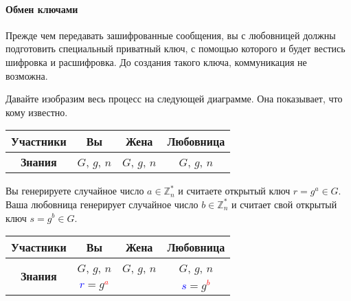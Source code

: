 \paragraph{Обмен ключами}

Прежде чем передавать зашифрованные сообщения, вы с любовницей должны подготовить специальный приватный ключ, с помощью которого и будет вестись шифровка и расшифровка.
До создания такого ключа, коммуникация не возможна.

Давайте изобразим весь процесс на следующей диаграмме.
Она показывает, что кому известно.
\begin{center}
\begin{tabular}{|c|c|c|c|}
\hline
{\bf Участники}&{Вы}&{Жена}&{Любовница}\\
\hline
{\bf Знания}&{\textcolor{OliveGreen}{$G$}, \textcolor{OliveGreen}{$g$}, \textcolor{OliveGreen}{$n$}}&{\textcolor{OliveGreen}{$G$}, \textcolor{OliveGreen}{$g$}, \textcolor{OliveGreen}{$n$}}&{\textcolor{OliveGreen}{$G$}, \textcolor{OliveGreen}{$g$}, \textcolor{OliveGreen}{$n$}}\\
\hline
\end{tabular}
\end{center}

Вы генерируете случайное число $a\in \mathbb Z_n^*$ и считаете открытый ключ $r = g^a\in G$.
Ваша любовница генерирует случайное число $b\in \mathbb Z_n^*$ и считает свой открытый ключ $s = g^b\in G$.
\begin{center}
\begin{tabular}{|c|c|c|c|}
\hline
{\bf Участники}&{Вы}&{Жена}&{Любовница}\\
\hline
\multirow{2}{*}{\bf Знания}&{\textcolor{OliveGreen}{$G$}, \textcolor{OliveGreen}{$g$}, \textcolor{OliveGreen}{$n$}}&{\textcolor{OliveGreen}{$G$}, \textcolor{OliveGreen}{$g$}, \textcolor{OliveGreen}{$n$}}&{\textcolor{OliveGreen}{$G$}, \textcolor{OliveGreen}{$g$}, \textcolor{OliveGreen}{$n$}}\\
{}&{ \textcolor{blue}{$r$}$=$\textcolor{OliveGreen}{$ g$}\textcolor{red}{${}^a$}}&{}&{ \textcolor{blue}{$s$}$=$\textcolor{OliveGreen}{$g$}\textcolor{red}{${}^b$}}\\
\hline
\end{tabular}
\end{center}

